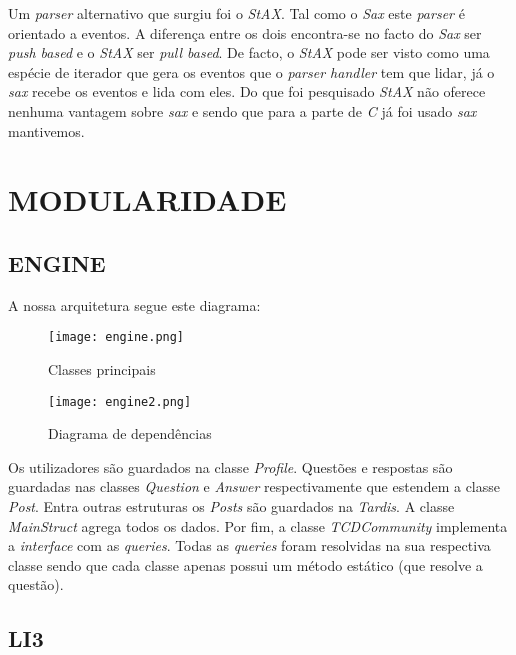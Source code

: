 \documentclass[letterpaper, 10 pt, conference]{IEEEtran} %
\begin{document}
Um \textit{parser} alternativo que surgiu foi o \textit{StAX}.
Tal como o \textit{Sax} este \textit{parser} é orientado a eventos. A diferença entre os dois encontra-se no facto do \textit{Sax} ser \textit{push based} e o \textit{StAX} ser \textit{pull based}. De facto, o \textit{StAX} pode ser visto como uma espécie de iterador que gera os eventos que o \textit{parser handler} tem que lidar, já o \textit{sax} recebe os eventos e lida com eles.
Do que foi pesquisado \textit{StAX} não oferece nenhuma vantagem sobre \textit{sax} e sendo que para a parte de \textit{C} já foi usado \textit{sax} mantivemos.


\section{MODULARIDADE}

\subsection{ENGINE}
A nossa arquitetura segue este diagrama:

\begin{figure}[h!]
  \centering
  \texttt{[image: engine.png]}
   \caption{Classes principais}
\end{figure}

\begin{figure}[h!]
  \centering
  \texttt{[image: engine2.png]}
   \caption{Diagrama de dependências}
\end{figure}

Os utilizadores são guardados na classe \textit{Profile}. Questões e respostas são guardadas nas classes \textit{Question} e \textit{Answer} respectivamente que estendem a classe \textit{Post}. Entra outras estruturas os \textit{Posts} são guardados na \textit{Tardis}.
A classe \textit{MainStruct} agrega todos os dados. Por fim, a classe \textit{TCDCommunity} implementa a \textit{interface} com as \textit{queries}.
Todas as \textit{queries} foram resolvidas na sua respectiva classe sendo que cada classe apenas possui um método estático (que resolve a questão).

\subsection{LI3}
\end{document}
